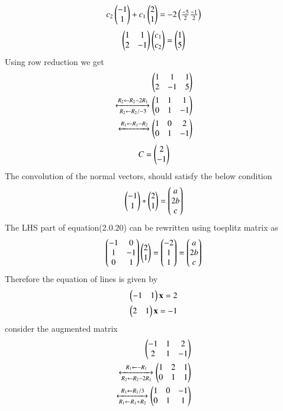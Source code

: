 \documentclass[journal,12pt,twocolumn]{IEEEtran}
\begin{document}
 \begin{align}
 c_2\begin{pmatrix}-1\\1\end{pmatrix}+c_1\begin{pmatrix}2\\1\end{pmatrix} =-2\begin{pmatrix}\frac{-5}{2}\frac{-1}{2}\end{pmatrix}
 \end{align}
 \begin{align}
 \begin{pmatrix}1&1\\2&-1\end{pmatrix}\begin{pmatrix}c_1\\c_2\end{pmatrix}=\begin{pmatrix}1\\5\end{pmatrix}
 \end{align}
 Using row reduction we get
 \begin{align}
\begin{pmatrix}1&1&1\\2&-1&5\end{pmatrix}\\
\xleftrightarrow[R_2\leftarrow R_2/-3]{R_2\leftarrow R_2-2R_1}
\begin{pmatrix}1&1&1\\0&1&-1\end{pmatrix}\\\xleftrightarrow[]{R_1\leftarrow R_1-R_2}
\begin{pmatrix}1&0&2\\0&1&-1\end{pmatrix}
\end{align}
\begin{align}
C  =\begin{pmatrix}2\\-1\end{pmatrix}
\end{align}
 The convolution of the normal vectors, should satisfy the below condition
 \begin{align}
    \begin{pmatrix}-1\\1\end{pmatrix}*\begin{pmatrix}2\\1\end{pmatrix}=\begin{pmatrix}a\\2b\\c\end{pmatrix}
\end{align}
The LHS part of equation(2.0.20) can be rewritten using toeplitz matrix as
\begin{align}
    \begin{pmatrix}-1&0\\1&-1\\0&1\end{pmatrix}\begin{pmatrix}2\\1\end{pmatrix}=\begin{pmatrix}-2\\1\\1\end{pmatrix}=\begin{pmatrix}a\\2b\\c\end{pmatrix}
\end{align}
Therefore the equation of lines is given by 
\begin{align}
\begin{pmatrix}-1&1\end{pmatrix}\mathbf{x}=2\\
\begin{pmatrix}2&1\end{pmatrix}\mathbf{x}=-1
\end{align}
consider the augmented matrix
\begin{align}
\begin{pmatrix}-1&1&2\\2&1&-1\end{pmatrix}\\
\xleftrightarrow[R_2\leftarrow R_2-2R_1]{R_1\leftarrow -R_1}
\begin{pmatrix}1&2&1\\0&1&1\end{pmatrix}\\\xleftrightarrow[R_1\leftarrow R_1+R_2]{R_1\leftarrow R_1/3}
\begin{pmatrix}1&0&-1\\0&1&1\end{pmatrix}
\end{align}
\end{document}
